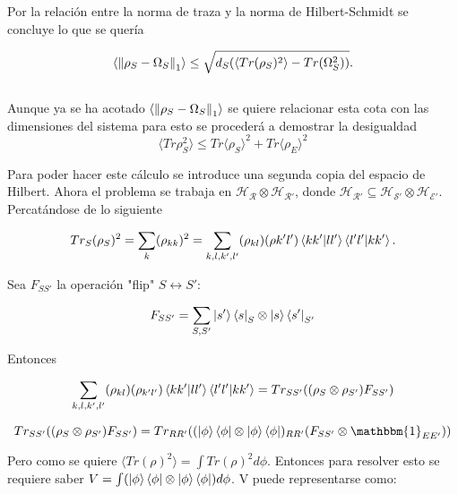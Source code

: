 Por la relación entre la norma de traza y la norma de Hilbert-Schmidt se concluye lo que se quería

\begin{equation}
\langle \norm{ \rho_{S}-\Omega_{S} }_{1}\rangle \le \sqrt{d_{S}( \langle Tr(\rho_{S})^{2}\rangle -Tr(\Omega_{S}^{2}) ) }.
\end{equation}
\\
Aunque ya se ha acotado $\langle \norm{ \rho_{S}-\Omega_{S} }_{1}\rangle$ se quiere relacionar esta cota con las dimensiones del sistema para esto se procederá a demostrar la desigualdad
\begin{equation}
\langle Tr \rho_{S}^{2} \rangle \le Tr \langle \rho_{S} \rangle^{2} +Tr \langle \rho_E \rangle^{2}
\end{equation}

Para poder hacer este cálculo se introduce una segunda copia del espacio de Hilbert. Ahora el problema se trabaja en $\mathcal{H_{R}} \otimes \mathcal{H_{R'}}$, donde $\mathcal{H_{R'}} \subseteq \mathcal{H_{S'} \otimes H_{E'}}$.
Percatándose de lo siguiente

\begin{equation}
Tr_{S} (\rho_{S})^2 = \sum_{k} (\rho_{kk})^{2} = \sum_{k,l,k',l'}(\rho_{kl})(\rho{k'l'}) \bra{kk'}\ket{ll'}\bra{l'l'}\ket{kk'}.
\end{equation}

Sea $F_{SS'}$ la operación "flip" $S \longleftrightarrow S'$:

\begin{equation}
F_{SS'} =\sum_{S,S'} \ket{s'}\bra{s}_{S} \otimes \ket{s}\bra{s'}_{S'}
\end{equation}

Entonces

\begin{equation} \label{eq:1}
\sum_{k,l,k',l'}(\rho_{kl})(\rho_{k'l'}) \bra{kk'}\ket{ll'}\bra{l'l'}\ket{kk'}= Tr_{SS'} ((\rho_{S} \otimes \rho_{S'})F_{SS'})
\end{equation}

\begin{equation}
Tr_{SS'} ((\rho_{S} \otimes \rho_{S'})F_{SS'})=Tr_{RR'}((\ket{\phi} \bra{\phi} \otimes \ket{\phi} \bra{\phi})_{RR'}(F_{SS'} \otimes \mathbbm{1}_{EE'}))
\end{equation}

Pero como se quiere $\langle Tr (\rho)^{2} \rangle= \int Tr (\rho)^{2} d\phi $. Entonces para resolver esto se requiere saber $V=\int (\ket{\phi} \bra{\phi} \otimes \ket{\phi} \bra{\phi})d\phi$. V puede representarse como:

